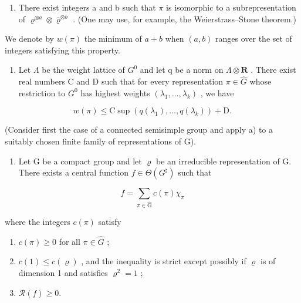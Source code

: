 \begin{enumerate}
\def\labelenumi{\alph{enumi})}
\tightlist
\item
  There exist integers a and b such that \(\pi\) is isomorphic to a subrepresentation of \(\varrho^{\otimes a} \otimes \overline{\varrho}^{\otimes b}\) . (One may use, for example, the Weierstrass--Stone theorem.)
\end{enumerate}

We denote by \(w(\pi)\) the minimum of \(a + b\) when \((a, b)\) ranges over the set of integers satisfying this property.

\begin{enumerate}
\def\labelenumi{\alph{enumi})}
\setcounter{enumi}{1}
\tightlist
\item
  Let \(\Lambda\) be the weight lattice of \(G^{0}\) and let q be a norm on \(\Lambda\otimes \mathbf{R}\) . There exist real numbers C and D such that for every representation \(\pi\in\widehat{G}\) whose restriction to \(G^{0}\) has highest weights \((\lambda_{1},\ldots,\lambda_{k})\) , we have
\end{enumerate}

\[
w (\pi) \leqslant \mathrm{C} \sup (q (\lambda_ {1}), \dots , q (\lambda_ {k})) + \mathrm{D}.
\]

(Consider first the case of a connected semisimple group and apply a) to a suitably chosen finite family of representations of G).

\begin{enumerate}
\def\labelenumi{\arabic{enumi})}
\setcounter{enumi}{5}
\tightlist
\item
  Let G be a compact group and let \(\varrho\) be an irreducible representation of G. There exists a central function \(f \in \Theta(G^{\sharp})\) such that
\end{enumerate}

\[
f = \sum_ {\pi \in \widehat {\mathrm{G}}} c (\pi) \chi_ {\pi}
\]

where the integers \(c(\pi)\) satisfy

\begin{enumerate}
\def\labelenumi{(\roman{enumi})}
\item
  \(c(\pi) \geqslant 0\) for all \(\pi \in \widehat{G}\) ;
\item
  \(c(1) \leqslant c(\varrho)\) , and the inequality is strict except possibly if \(\varrho\) is of dimension 1 and satisfies \(\varrho^{2} = 1\) ;
\item
  \(\mathcal{R}(f) \geqslant 0.\)
\end{enumerate}

